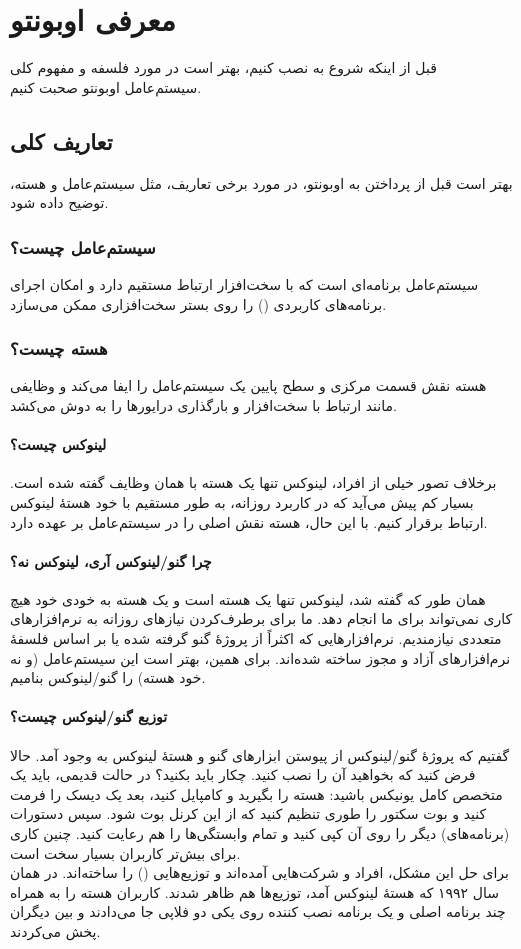 \chapter{معرفی اوبونتو}
قبل از اینکه شروع به نصب کنیم، بهتر است در مورد فلسفه و مفهوم کلی سیستم‌عامل اوبونتو صحبت کنیم.
\section{تعاریف کلی}
بهتر است قبل از پرداختن به اوبونتو، در مورد برخی تعاریف، مثل سیستم‌عامل و هسته، توضیح داده شود.
\subsection{سیستم‌عامل چیست؟}
سیستم‌عامل برنامه‌ای است که با سخت‌افزار ارتباط مستقیم دارد و امکان اجرای برنامه‌های کاربردی () را روی بستر سخت‌افزاری ممکن می‌سازد.
\subsection{هسته چیست؟}
هسته نقش قسمت مرکزی و سطح پایین یک سیستم‌عامل را ایفا می‌کند و وظایفی مانند ارتباط با سخت‌افزار و بارگذاری درایورها را به دوش می‌کشد.
\subsubsection{لینوکس چیست؟}
برخلاف تصور خیلی از افراد، لینوکس تنها یک هسته با همان وظایف گفته شده است. بسیار کم پیش می‌آید که در کاربرد روزانه، به طور مستقیم با خود هستهٔ لینوکس ارتباط برقرار کنیم. با این حال، هسته نقش اصلی را در سیستم‌عامل بر عهده دارد.
\subsubsection{چرا گنو/لینوکس آری، لینوکس نه؟}
همان طور که گفته شد، لینوکس تنها یک هسته است و یک هسته به خودی خود هیچ کاری نمی‌تواند برای ما انجام دهد. ما برای برطرف‌کردن نیازهای روزانه به نرم‌افزارهای متعددی نیازمندیم. نرم‌افزارهایی که اکثراً از پروژهٔ گنو گرفته شده یا بر اساس فلسفهٔ نرم‌افزارهای آزاد و مجوز  ساخته شده‌اند. برای همین، بهتر است این سیستم‌عامل (و نه خود هسته) را گنو/لینوکس بنامیم.
\subsubsection{توزیع گنو/لینوکس چیست؟}
گفتیم که پروژهٔ گنو/لینوکس از پیوستن ابزارهای گنو و هستهٔ لینوکس به وجود آمد. حالا فرض کنید که بخواهید آن را نصب کنید. چکار باید بکنید؟ در حالت قدیمی، باید یک متخصص کامل یونیکس باشید: هسته را بگیرید و کامپایل کنید، بعد یک دیسک را فرمت کنید و بوت سکتور را طوری تنظیم کنید که از این کرنل بوت شود. سپس دستورات (برنامه‌های) دیگر را روی آن کپی کنید و تمام وابستگی‌ها را هم رعایت کنید. چنین کاری برای بیش‌تر کاربران بسیار سخت است.\\
برای حل این مشکل، افراد و شرکت‌هایی آمده‌اند و توزیع‌هایی () را ساخته‌اند. در همان سال ۱۹۹۲ که هستهٔ لینوکس آمد، توزیع‌ها هم ظاهر شدند. کاربران هسته را به همراه چند برنامه اصلی و یک برنامه نصب کننده روی یکی دو فلاپی جا می‌دادند و بین دیگران پخش می‌کردند.
